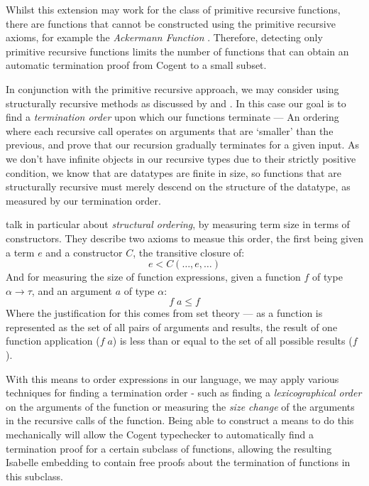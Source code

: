 Whilst this extension may work for the class of primitive recursive functions, there are functions that
cannot be constructed using the primitive recursive axioms, for example the \textit{Ackermann Function}
\citep{Ackermann}. Therefore, detecting only primitive recursive functions limits the number of functions that
can obtain an automatic termination proof from Cogent to a small subset.

In conjunction with the primitive recursive approach, we may consider using
structurally recursive methods as discussed by \citet{StrucrecStructures} and \citet{PredicateStructrec}.
In this case our goal is to find a \textit{termination order} upon which our functions terminate --- An ordering
where each recursive call operates on arguments that are `smaller' than the previous, and prove 
that our recursion gradually terminates for a given input. 
As we don't have infinite objects in our recursive types due to their strictly positive condition, 
we know that are datatypes are finite in size, so functions that are  structurally recursive must
merely descend on the structure of the datatype, as measured by our termination order.

\citet{PredicateStructrec} talk in particular about \textit{structural ordering}, by measuring term size in
terms of constructors. They describe two axioms to measue this order, the first being given
a term $e$ and a constructor $C$, the transitive closure of:
$$
    e < C (\dots, e, \dots)
$$
And for measuring the size of function expressions, given a function $f$ of type $\alpha \longrightarrow \tau$,
and an argument $a$ of type $\alpha$:
$$
    f\; a \leq f
$$
Where the justification for this comes from set theory --- as a function is represented as the set of all pairs of
arguments and results, the result of one function application ($f\; a$) is less than or equal to the set of
all possible results ($f$).

With this means to order expressions in our language, we may apply various techniques for finding a termination
order - such as finding a \textit{lexicographical order} on the arguments of the function or measuring the \textit{size change}
of the arguments in the recursive calls of the function. Being able to construct a means to do this
mechanically will allow the Cogent typechecker to automatically find a termination proof for a certain subclass
of functions, allowing the resulting Isabelle embedding to contain free proofs about the termination of functions in this subclass. 